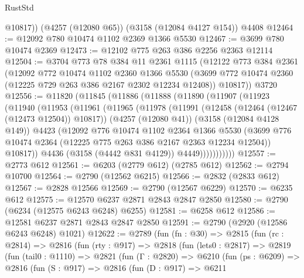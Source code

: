 \begin{lexlean}{RustStd}
\begin{coremodule}
{\begin{coremodule}
{{{{{{{{{{{{{{{{{{{{{{{{{{        @10817))
    (@4257 (@12080 @65))
    (@3158 (@12084 @4127 @154))
    @4408
@12464 := @12092 @780 @10474 @1102 @2369 @1366 @5530
@12467 := @3699 @780 @10474 @2369
@12473 := @12102 @775 @263 @386 @2256 @2363 @12114
@12504 := @3704
    @773
    @78
    @384
    @11
    @2361
    @1115
    (@12122
      @773
      @384
      @2361
      (@12092
        @772
        @10474
        @1102
        @2360
        @1366
        @5530
        (@3699 @772 @10474 @2360 (@12225 @729 @263 @386 @2167 @2302 @12234 @12408))
        @10817))
    @3720
@12556 := @11820
    (@11845
      (@11886
        (@11888
          (@11890
            (@11907
              (@11923
                (@11940
                  (@11953
                    (@11961
                      (@11965
                        (@11978
                          (@11991
                            (@12458 (@12464 (@12467 (@12473 @12504)) @10817))
                            (@4257 (@12080 @41))
                            (@3158 (@12084 @4128 @149))
                            @4423
                            (@12092
                              @776
                              @10474
                              @1102
                              @2364
                              @1366
                              @5530
                              (@3699
                                @776
                                @10474
                                @2364
                                (@12225 @775 @263 @386 @2167 @2363 @12234 @12504))
                              @10817))
                          @4436
                          (@3158 (@4442 @831 @4129))
                          @4449)))))))))))
@12557 := @2773 @612
@12561 := @6203 (@2779 @612) (@2785 @612)
@12562 := @2794 @10700
@12564 := @2790 (@12562 @6215)
@12566 := @2832 (@2833 @612)
@12567 := @2828 @12566
@12569 := @2790 (@12567 @6229)
@12570 := @6235 @612
@12575 := @12570 @6237 @2871 @2843 @2847 @2850
@12580 := @2790 (@6234 (@12575 @6243 @6248) @6255)
@12581 := @6258 @612
@12586 := @12581 @6237 @2871 @2843 @2847 @2850
@12591 := @2790 (@2920 (@12586 @6243 @6248) @1021)
@12622 := @2789
    (fun (fn : @30) =>
    @2815
      (fun (rc : @2814) =>
      @2816
        (fun (rty : @917) =>
        @2818
          (fun (lets0 : @2817) =>
          @2819
            (fun (tail0 : @1110) =>
            @2821
              (fun (Γ : @2820) =>
              @6210
                (fun (ps : @6209) =>
                @2816
                  (fun (S : @917) =>
                  @2816
                    (fun (D : @917) =>
                    @6211
}}}}}}}}}}}}}}}}}}}}}}}}}}
\end{coremodule}}
\end{coremodule}
\end{lexlean}
